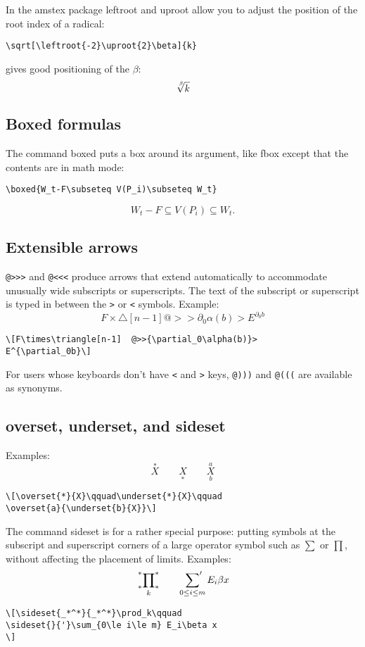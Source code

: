\documentclass[draft]{amsart}
\newcommand{\ntt}{\normalfont\ttfamily}
\newcommand{\cn}[1]{{\protect\ntt\bslash#1}}
\newcommand{\pkg}[1]{{\protect\ntt#1}}
\theoremstyle{definition}
\theoremstyle{remark}
\begin{document}
In the \pkg{amstex} package \cn{leftroot} and \cn{uproot} allow you to adjust
the position of the root index of a radical:
\begin{verbatim}
\sqrt[\leftroot{-2}\uproot{2}\beta]{k}
\end{verbatim}
gives good positioning of the $\beta$:
\[\sqrt[\leftroot{-2}\uproot{2}\beta]{k}\]

\subsection{Boxed formulas} The command \cn{boxed} puts a box around its
argument, like \cn{fbox} except that the contents are in math mode:
\begin{verbatim}
\boxed{W_t-F\subseteq V(P_i)\subseteq W_t}
\end{verbatim}
\[\boxed{W_t-F\subseteq V(P_i)\subseteq W_t}.\]

\subsection{Extensible arrows} \verb"@>>>" and \verb"@<<<" produce
arrows that extend automatically to accommodate unusually wide
subscripts or superscripts.  The text of the subscript or superscript
is typed in between the \verb+>+ or \verb+<+ symbols.
Example:
\[F\times\triangle[n-1]  @>>{\partial_0\alpha(b)}>
E^{\partial_0b}\]
\begin{verbatim}
\[F\times\triangle[n-1]  @>>{\partial_0\alpha(b)}>
E^{\partial_0b}\]
\end{verbatim}
For users whose keyboards don't have \verb=<= and \verb=>=
keys, \verb=@)))= and \verb=@(((= are available as synonyms.


\subsection{\cn{overset}, \cn{underset}, and \cn{sideset}}
Examples:
\[\overset{*}{X}\qquad\underset{*}{X}\qquad
\overset{a}{\underset{b}{X}}\]
\begin{verbatim}
\[\overset{*}{X}\qquad\underset{*}{X}\qquad
\overset{a}{\underset{b}{X}}\]
\end{verbatim}

The command \cn{sideset} is for a rather special
purpose: putting symbols at the subscript and superscript
corners of a large operator symbol such as $\sum$ or $\prod$,
without affecting the placement of limits.
Examples:
\[\sideset{_*^*}{_*^*}\prod_k\qquad
\sideset{}{'}\sum_{0\le i\le m} E_i\beta x
\]
\begin{verbatim}
\[\sideset{_*^*}{_*^*}\prod_k\qquad
\sideset{}{'}\sum_{0\le i\le m} E_i\beta x
\]
\end{verbatim}
\end{document}
